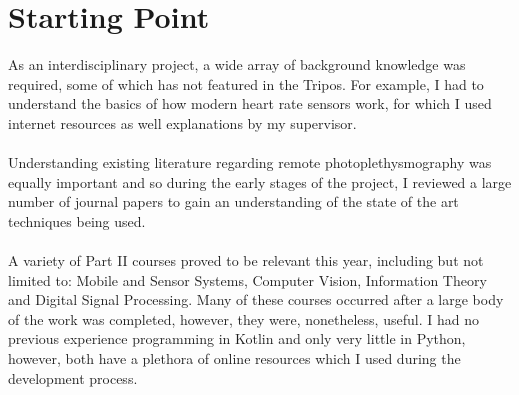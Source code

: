 \section{Starting Point}
As an interdisciplinary project, a wide array of background knowledge was required, some of which has not featured in the Tripos.
For example, I had to understand the basics of how modern heart rate sensors work, for which I used internet resources as well explanations by my supervisor.
\\\\
Understanding existing literature regarding remote photoplethysmography was equally important and so during the early stages of the project, I reviewed
a large number of journal papers to gain an understanding of the state of the art techniques being used.
\\\\
A variety of Part II courses proved to be relevant this year, including but not limited to: Mobile and Sensor Systems, Computer Vision, Information Theory and Digital Signal Processing. Many of these courses occurred after a large body of the work was completed, however, they were, nonetheless, useful.
I had no previous experience programming in Kotlin and only very little in Python, however, both have a plethora of online resources which I used 
during the development process.